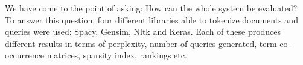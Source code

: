 We have come to the point of asking: How can the whole system be evaluated? To answer this question, four different libraries able to tokenize documents and queries were used: Spacy, Gensim, Nltk and Keras.
Each of these produces different results in terms of perplexity, number of queries generated, term co-occurrence matrices, sparsity index, rankings etc.